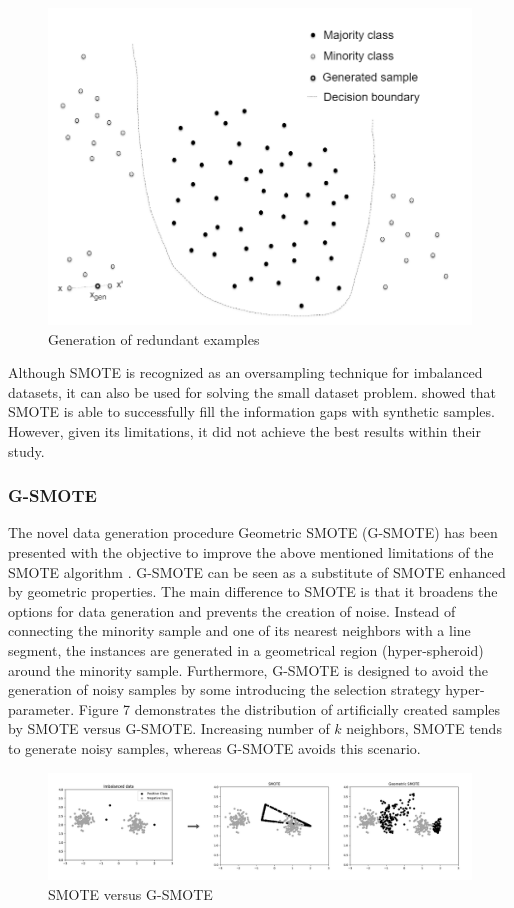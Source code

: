 \documentclass[parskip=full]{scrartcl}
\begin{document}
\begin{figure}[H]
	\centering
	\includegraphics[width=0.6\linewidth]{./resources/redundant_examples}
	\caption{Generation of redundant examples \cite{Douzas.2019b}}
	\label{fig:redundant-examples}
\end{figure}

Although SMOTE is recognized as an oversampling technique for imbalanced datasets, it can also be 
used for solving the small dataset problem.  \cite{Li.2018} showed that SMOTE is able to successfully fill 
the information gaps with synthetic samples. However, given its limitations, it did not achieve 
the best results within their study.

\subsubsection{G-SMOTE}

The novel data generation procedure Geometric SMOTE (G-SMOTE) has been presented with the 
objective to improve the above mentioned limitations of the SMOTE algorithm \cite{Douzas.2019b}. 
G-SMOTE can be seen as a substitute of SMOTE enhanced by geometric properties. The main difference 
to SMOTE is that it broadens the options for data generation and prevents the creation of noise. Instead 
of connecting the minority sample and one of its nearest neighbors with a line segment, the instances 
are generated in a geometrical region (hyper-spheroid) around the minority sample. Furthermore, 
G-SMOTE is designed to avoid the generation of noisy samples by some introducing the selection 
strategy hyper-parameter. Figure 7 demonstrates the distribution of artificially created samples by 
SMOTE versus G-SMOTE. Increasing number of $\mathit{k}$ neighbors, SMOTE tends to generate noisy 
samples, whereas G-SMOTE avoids this scenario.

\begin{figure}[H]
	\centering
	\includegraphics[width=1\linewidth]{./resources/smote_vs_gsmote}
	\caption{SMOTE versus G-SMOTE \cite{Douzas.2019}}
	\label{fig:smotevsgsmote}
\end{figure}
\end{document}
